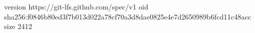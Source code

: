 version https://git-lfs.github.com/spec/v1
oid sha256:f0846b80ed3f7b013d022a78cf70a3d8dae0825e4e7d2650989b6fcd11c48acc
size 2412
